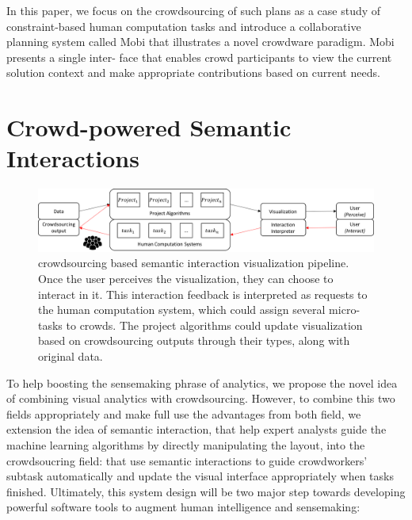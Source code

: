\documentclass[journal]{vgtc}                %
\begin{document}
In this paper, we focus on the crowdsourcing of such plans as a case study of constraint-based human computation tasks and introduce a collaborative planning system called Mobi that illustrates a novel crowdware paradigm. Mobi presents a single inter- face that enables crowd participants to view the current solution context and make appropriate contributions based on current needs.


\section{Crowd-powered Semantic Interactions}

\begin{figure}
 \centering %
  \includegraphics[width=\textwidth]{Pipeline}
 \caption{crowdsourcing based semantic interaction visualization pipeline.
 Once the user perceives the visualization, they can choose to interact in it.
 This interaction feedback is interpreted as requests to the human computation system, which could assign several micro-tasks to crowds.
 The project algorithms could update visualization based on crowdsourcing outputs through their types, along with original data.
	 }
 \label{fig:pipeline}
\end{figure}


To help boosting the sensemaking phrase of analytics, we propose the novel idea of combining visual analytics with crowdsourcing.
However, to combine this two fields appropriately and make full use the advantages from both field, we extension the idea of semantic interaction, that help expert analysts guide the machine learning algorithms by directly manipulating the layout, into the crowdsoucring field: that use semantic interactions to guide crowdworkers' subtask automatically and update the visual interface appropriately when tasks finished.
Ultimately, this system design will be two major step towards developing powerful software tools to augment human intelligence and sensemaking:
\end{document}
